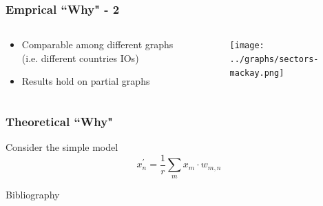 \documentclass{beamer}
\begin{document}
\begin{frame}
    \frametitle{Emprical ``Why" - 2}
    \begin{columns}
        \begin{column}{.49\textwidth}
            \begin{itemize}
                \item Comparable among different graphs (i.e. different countries IOs)
                \item Results hold on partial graphs
            \end{itemize}
        \end{column}
        \begin{column}{.49\textwidth}
            \begin{figure}
                \texttt{[image: ../graphs/sectors-mackay.png]}
            \end{figure}
        \end{column}
    \end{columns}
\end{frame}

\begin{frame}
    \frametitle{Theoretical ``Why"}
    Consider the simple model
    \begin{equation}
        x_n^\prime =\frac{1}{r} \sum_{m} x_m\cdot w_{m, n}
    \end{equation}
\end{frame}


\begin{frame}[allowframebreaks]{Bibliography}
    
    
\end{frame}
\end{document}
